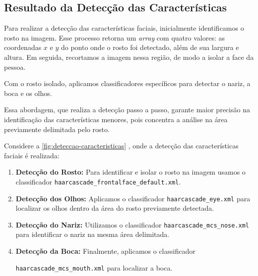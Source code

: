 \subsection{Resultado da Detecção das Características}

Para realizar a detecção das características faciais, inicialmente identificamos o rosto na imagem. Esse processo retorna um \textit{array} com quatro valores: as coordenadas $x$ e $y$ do ponto onde o rosto foi detectado, além de sua largura e altura. Em seguida, recortamos a imagem nessa região, de modo a isolar a face da pessoa.

Com o rosto isolado, aplicamos classificadores específicos para detectar o nariz, a boca e os olhos.

Essa abordagem, que realiza a detecção passo a passo, garante maior precisão na identificação das características menores, pois concentra a análise na área previamente delimitada pelo rosto.

Considere a  \autoref{fig:deteccao-caracteristicas} , onde a detecção das características faciais é realizada:

\begin{enumerate}
\item \textbf{Detecção do Rosto:} Para identificar e isolar o rosto na imagem usamos o classificador \texttt{haarcascade\_frontalface\_default.xml}.
\item \textbf{Detecção dos Olhos:} Aplicamos o classificador \texttt{haarcascade\_eye.xml} para localizar os olhos dentro da área do rosto previamente detectada.
\item \textbf{Detecção do Nariz:} Utilizamos o classificador \texttt{haarcascade\_mcs\_nose.xml} para identificar o nariz na mesma área delimitada.
\item \textbf{Detecção da Boca:} Finalmente, aplicamos o classificador 

\texttt{haarcascade\_mcs\_mouth.xml} para localizar a boca.
\end{enumerate}

